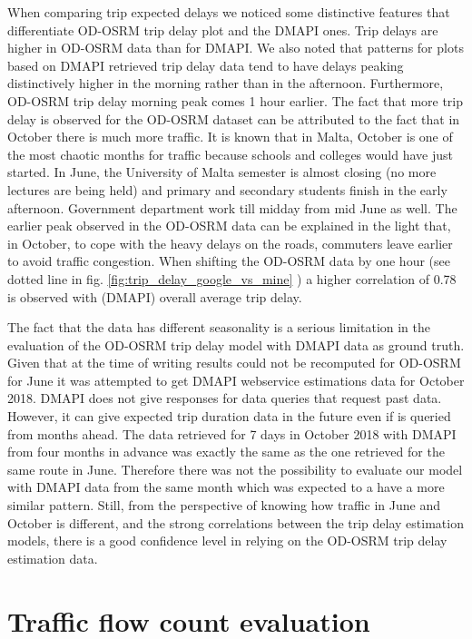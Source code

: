\documentclass[12pt, a4paper]{report}
\theoremstyle{definition}
\theoremstyle{definition}%
\theoremstyle{definition}%
\theoremstyle{definition}%
\theoremstyle{definition}%
\theoremstyle{definition}%
\begin{document}
When comparing trip expected delays we noticed some distinctive features that differentiate OD-OSRM trip delay plot and the DMAPI ones. Trip delays are higher in OD-OSRM data than for DMAPI. We also noted that patterns for plots based on DMAPI retrieved trip delay data tend to have delays peaking distinctively higher in the morning rather than in the afternoon. Furthermore, OD-OSRM trip delay morning peak comes 1 hour earlier. The fact that more trip delay is observed for the OD-OSRM dataset can be attributed to the fact that in October there is much more traffic. It is known that in Malta, October is one of the most chaotic months for traffic because schools and colleges would have just started. In June, the University of Malta semester is almost closing (no more lectures are being held) and primary and secondary students finish in the early afternoon. Government department work till midday from mid June as well. The earlier peak observed in the OD-OSRM data can be explained in the light that, in October, to cope with the heavy delays on the roads, commuters leave earlier to avoid traffic congestion. When shifting the OD-OSRM data by one hour (see dotted line in fig. \ref{fig:trip_delay_google_vs_mine} ) a higher correlation of 0.78 is observed with (DMAPI) overall average trip delay.

The fact that the data has different seasonality is a serious limitation in the evaluation of the OD-OSRM trip delay model with DMAPI data as ground truth. Given that at the time of writing results could not be recomputed for OD-OSRM for June it was attempted to get DMAPI webservice estimations data for October 2018. DMAPI does not give responses for data queries that request past data. However, it can give expected trip duration data in the future even if is queried from months ahead. The data retrieved for 7 days in October 2018 with DMAPI from four months in advance was exactly the same as the one retrieved for the same route in June. Therefore there was not the possibility to evaluate our model with DMAPI data from the same month which was expected to a have a more similar pattern. Still, from the perspective of knowing how traffic in June and October is different, and the strong correlations between the trip delay estimation models, there is a good confidence level in relying on the OD-OSRM trip delay estimation data.	

\section{Traffic flow count evaluation} \label{section:traffic_flow_evaluation}
\end{document}
